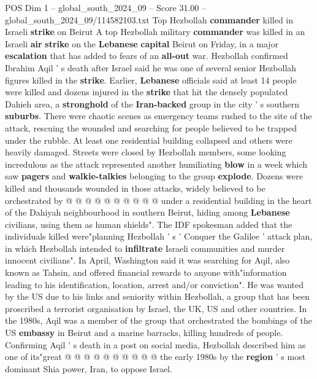 \begin{textsample}{POS Dim 1 – global\_south\_2024\_09 – Score 31.00 – global\_south\_2024\_09/114582103.txt}  \label{ex:f1_pos_036}
Top Hezbollah \textbf{commander} killed in Israeli \textbf{strike} on Beirut A top Hezbollah military \textbf{commander} was killed in an Israeli \textbf{air} \textbf{strike} on the \textbf{Lebanese} \textbf{capital} Beirut on Friday, in a major \textbf{escalation} that has added to fears of an \textbf{all-out} war.
Hezbollah confirmed Ibrahim Aqil ' s death after Israel said he was one of several senior Hezbollah figures killed in the \textbf{strike}.
Earlier, \textbf{Lebanese} officials said at least 14 people were killed and dozens injured in the \textbf{strike} that hit the densely populated Dahieh area, a \textbf{stronghold} of the \textbf{Iran-backed} group in the city ' s southern \textbf{suburbs}.
There were chaotic scenes as emergency teams rushed to the site of the attack, rescuing the wounded and searching for people believed to be trapped under the rubble.
At least one residential building collapsed and others were heavily damaged.
Streets were closed by Hezbollah members, some looking incredulous as the attack represented another humiliating \textbf{blow} in a week which saw \textbf{pagers} and \textbf{walkie-talkies} belonging to the group \textbf{explode}.
Dozens were killed and thousands wounded in those attacks, widely believed to be orchestrated by @ @ @ @ @ @ @ @ @ @ under a residential building in the heart of the Dahiyah neighbourhood in southern Beirut, hiding among \textbf{Lebanese} civilians, using them as human shields".
The IDF spokesman added that the individuals killed were"planning Hezbollah ' s ' Conquer the Galilee ' attack plan, in which Hezbollah intended to \textbf{infiltrate} Israeli communities and murder innocent civilians".
In April, Washington said it was searching for Aqil, also known as Tahsin, and offered financial rewards to anyone with"information leading to his identification, location, arrest and/or conviction".
He was wanted by the US due to his links and seniority within Hezbollah, a group that has been proscribed a terrorist organisation by Israel, the UK, US and other countries.
In the 1980s, Aqil was a member of the group that orchestrated the bombings of the US \textbf{embassy} in Beirut and a marine barracks, killing hundreds of people.
Confirming Aqil ' s death in a post on social media, Hezbollah described him as one of its"great @ @ @ @ @ @ @ @ @ @ the early 1980s by the \textbf{region} ' s most dominant Shia power, Iran, to oppose Israel.

\end{textsample}
